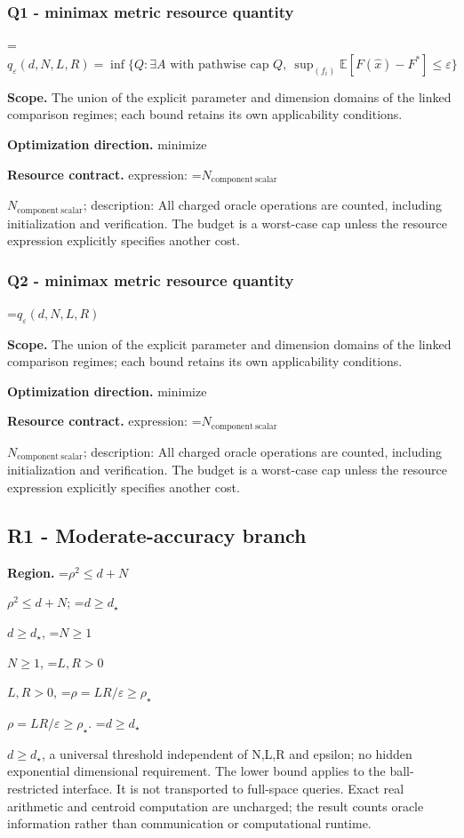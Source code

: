 \documentclass[10pt,a4paper]{article}
\newcommand{\AtlasMath}[1]{\par\begingroup\centering\setbox0=\hbox{$\displaystyle #1$}\ifdim\wd0>1.4\linewidth\typeout{ATLAS WIDE FORMULA: \the\wd0}\fi\ifdim\wd0>\linewidth\resizebox{\linewidth}{!}{\box0}\else\box0\fi\par\endgroup}
\newcommand{\AtlasInlineMath}[1]{\begingroup\setbox0=\hbox{$#1$}\ifdim\wd0>.4\linewidth\endgroup\AtlasMath{#1}\else\endgroup$#1$\fi}
\begin{document}
\subsubsection{Q1 - minimax metric resource quantity}


\AtlasMath{q_\varepsilon(d,N,L,R)=\inf\{Q:\exists A\text{ with pathwise cap }Q,\ \sup_{(f_i)}\mathbb E[F(\widehat x)-F^*]\le\varepsilon\}}


\textbf{Scope.} The union of the explicit parameter and dimension domains of the linked comparison regimes; each bound retains its own applicability conditions.



\textbf{Optimization direction.} minimize



\textbf{Resource contract.} expression: \AtlasInlineMath{N_{\mathrm{component\ scalar}}}; description: All charged oracle operations are counted, including initialization and verification. The budget is a worst-case cap unless the resource expression explicitly specifies another cost.



\subsubsection{Q2 - minimax metric resource quantity}


\AtlasMath{q_\varepsilon(d,N,L,R)}


\textbf{Scope.} The union of the explicit parameter and dimension domains of the linked comparison regimes; each bound retains its own applicability conditions.



\textbf{Optimization direction.} minimize



\textbf{Resource contract.} expression: \AtlasInlineMath{N_{\mathrm{component\ scalar}}}; description: All charged oracle operations are counted, including initialization and verification. The budget is a worst-case cap unless the resource expression explicitly specifies another cost.



\subsection{R1 - Moderate-accuracy branch}


\textbf{Region.} \AtlasInlineMath{\rho^2\le d+N}; \AtlasInlineMath{d\ge d_\star}, \AtlasInlineMath{N\ge1}, \AtlasInlineMath{L,R>0}, \AtlasInlineMath{\rho=LR/\varepsilon\ge\rho_\star}. \AtlasInlineMath{d\ge d_\star}, a universal threshold independent of N,L,R and epsilon; no hidden exponential dimensional requirement. The lower bound applies to the ball-restricted interface. It is not transported to full-space queries. Exact real arithmetic and centroid computation are uncharged; the result counts oracle information rather than communication or computational runtime.
\end{document}
